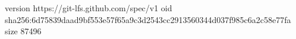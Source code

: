 version https://git-lfs.github.com/spec/v1
oid sha256:6d75839daad9bf553e57f65a9c3d2543cc2913560344d037f985c6a2c58e77fa
size 87496
